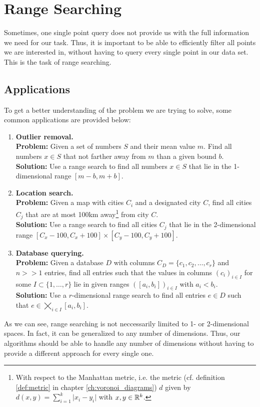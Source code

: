 \section{Range Searching}
    Sometimes, one single point query does not provide us with the full information we need for our task. Thus, it is important to be able to efficiently filter all points we are interested in, without having to query every single point in our data set. This is the task of range searching. 

    \subsection{Applications}
        To get a better understanding of the problem we are trying to solve, some common applications are provided below: 
        \begin{enumerate}
            \item \textbf{Outlier removal.} \\
            \textbf{Problem:} Given a set of numbers $S$ and their mean value $m$. Find all numbers $x \in S$ that not farther away from $m$ than a given bound $b$. \\
            \textbf{Solution:} Use a range search to find all numbers $x \in S$ that lie in the 1-dimensional range $[m-b, m+b]$.

            \item \textbf{Location search.} \\ 
            \textbf{Problem:} Given a map with cities $C_i$ and a designated city $C$, find all cities $C_j$ that are at most 100km away\footnote{With respect to the Manhattan metric, i.e. the metric (cf. definition \ref{def:metric} in chapter \ref{ch:voronoi_diagrams}) $d$ given by $d(x, y) = \sum_{i = 1}^{k} \vert x_i - y_i \vert$ with $x,y \in \mathbb{R}^k$.} from city $C$. \\
            \textbf{Solution:} Use a range search to find all cities $C_j$ that lie in the 2-dimensional range $[C_x - 100, C_x + 100] \times [C_y - 100, C_y + 100]$.

            \item \textbf{Database querying.} \\
            \textbf{Problem:} Given a database $D$ with columns $C_D = \{c_1, c_2, \dots, c_r\}$ and $n >> 1$ entries, find all entries such that the values in columns $(c_i)_{i \in I}$ for some $I \subset \{1, \dots, r\}$ lie in given ranges $([a_i, b_i])_{i \in I}$ with $a_i < b_i$. \\
            \textbf{Solution:} Use a $r$-dimensional range search to find all entries $e \in D$ such that $e \in \bigtimes_{i \in I} [a_i, b_i]$.
        \end{enumerate}
        As we can see, range searching is not neccessarily limited to 1- or 2-dimensional spaces. In fact, it can be generalized to any number of dimensions. Thus, our algorithms should be able to handle any number of dimensions without having to provide a different approach for every single one.

